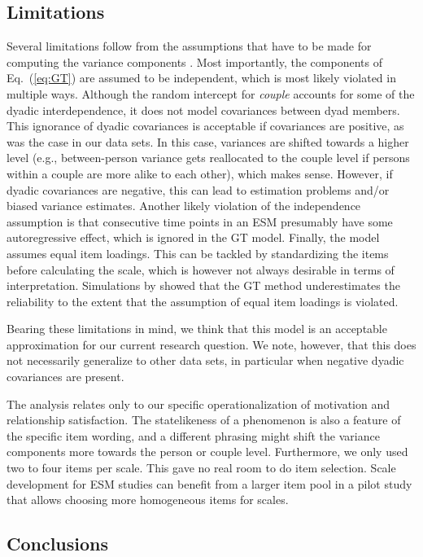 \documentclass[jou,a4paper,draftfirst]{apa6}\usepackage[]{graphicx}\usepackage[]{color}
\begin{document}
\subsection{Limitations}

Several limitations follow from the assumptions that have to be made for computing the variance components \parencite{shrout_Psychometrics_2012}.
Most importantly, the components of Eq.~(\ref{eq:GT}) are assumed to be independent, which is most likely violated in multiple ways. Although the random intercept for \emph{couple} accounts for some of the dyadic interdependence, it does not model covariances between dyad members. This ignorance of dyadic covariances is acceptable if covariances are positive, as was the case in our data sets. In this case, variances are shifted towards a higher level (e.g., between-person variance gets reallocated to the couple level if persons within a couple are more alike to each other), which makes sense. However, if dyadic covariances are negative, this can lead to estimation problems and/or biased variance estimates.
Another likely violation of the independence assumption is that consecutive time points in an ESM presumably have some autoregressive effect, which is ignored in the GT model.
Finally, the model assumes equal item loadings. This can be tackled by standardizing the items before calculating the scale, which is however not always desirable in terms of interpretation.
Simulations by \textcite{lane_AbstractAssessingReliability_2010} showed that the GT method underestimates the reliability to the extent that the assumption of equal item loadings is violated. 

Bearing these limitations in mind, we think that this model is an acceptable approximation for our current research question. We note, however, that this does not necessarily generalize to other data sets, in particular when negative dyadic covariances are present.

The analysis relates only to our specific operationalization of motivation and relationship satisfaction. The statelikeness of a phenomenon is also a feature of the specific item wording, and a different phrasing might shift the variance components more towards the person or couple level. Furthermore, we only used two to four items per scale. This gave no real room to do item selection. Scale development for ESM studies can benefit from a larger item pool in a pilot study that allows choosing more homogeneous items for scales.

\subsection{Conclusions}
\end{document}
